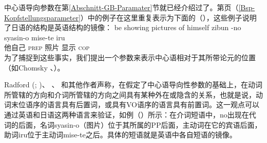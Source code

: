\mbox{}%
中心语导向参数在第\ref{Abschnitt-GB-Paramater}节就已经介绍过了。第\pageref{Bsp-Kopfstellungsparameter}页（\ref{Bsp-Kopfstellungsparameter}）中的例子在这里重复表示为下面的（），这些例子说明了日语的结构是英语结构的镜像：
\eal
\label{Bsp-Kopfstellungsparameter-zwei}
\ex 
be showing pictures of himself
\ex
\gll zibun  -no syasin-o mise-te iru\\
     他自己 \textsc{prep} 照片 显示 \textsc{cop}\\
\zl
为了捕捉到这些事实，我们提出一个参数来表示中心语相对于其所带论元的位置（如Chomsky \citeyear[]{Chomsky86}、\citeyear[]{Chomsky88a-u}）。

Radford (\citeyear[--61]{Radford90a-u}; \citeyear[--22]{Radford97a-u})、 \citet[, 238]{Pinker94a}、 \citet[]{Baker2003b}和其他作者声称，在假定了中心语导向性参数的基础上，在动词所管辖的方向和介词所管辖的方向之间具有某种外在或隐含的关系，也就是说，动词末位语序的语言具有后置词，或具有VO语序的语言具有前置词。这一观点可以通过英语和日语这两种语言来验证，如例（）所示：在介词短语中，no出现在代词的后面，名词syasin-o（图片）位于其所属的PP后面，主动词在它的宾语后面，助词iru位于主动词mise-te之后。具体的短语就是英语中各自短语的镜像。

